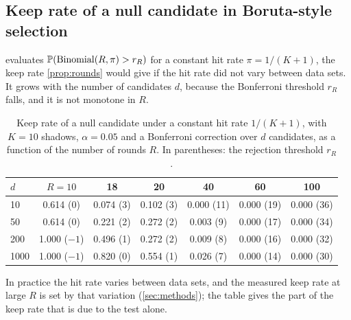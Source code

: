\subsection{Keep rate of a null candidate in Boruta-style selection}\label{app:rounds-grid}

 evaluates $\mathbb{P}(\operatorname{Binomial}(R,\pi) > r_R)$ for a constant hit rate $\pi = 1/(K+1)$, the keep rate \cref{prop:rounds} would give if the hit rate did not vary between data sets. It grows with the number of candidates $d$, because the Bonferroni threshold $r_R$ falls, and it is not monotone in $R$.

\begin{table}[h]
\centering\small
\caption{Keep rate of a null candidate under a constant hit rate $1/(K+1)$, with $K = 10$ shadows, $\alpha = 0.05$ and a Bonferroni correction over $d$ candidates, as a function of the number of rounds $R$. In parentheses: the rejection threshold $r_R$.}\label{tab:rounds-grid}
\begin{tabular}{lcccccc}
\toprule
$d$ & $R = 10$ & 18 & 20 & 40 & 60 & 100\\
\midrule
10 & 0.614 (0) & 0.074 (3) & 0.102 (3) & 0.000 (11) & 0.000 (19) & 0.000 (36)\\
50 & 0.614 (0) & 0.221 (2) & 0.272 (2) & 0.003 (9) & 0.000 (17) & 0.000 (34)\\
200 & 1.000 ($-1$) & 0.496 (1) & 0.272 (2) & 0.009 (8) & 0.000 (16) & 0.000 (32)\\
1000 & 1.000 ($-1$) & 0.820 (0) & 0.554 (1) & 0.026 (7) & 0.000 (14) & 0.000 (30)\\
\bottomrule
\end{tabular}
\end{table}

In practice the hit rate varies between data sets, and the measured keep rate at large $R$ is set by that variation (\cref{sec:methods}); the table gives the part of the keep rate that is due to the test alone.

